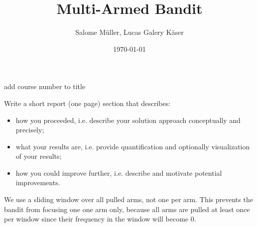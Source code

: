 \documentclass[10pt]{article}
\title{Multi-Armed Bandit}
\author{Salome Müller, Lucas Galery Käser}
\date{\today}
\newcommand{\todo}[1]{{\color{red}#1}}
\begin{document}
\maketitle

\todo{add course number to title}

\todo{
    Write a short report (one page) section that describes:
    \begin{itemize}
        \item how you proceeded, i.e. describe your solution approach conceptually and precisely;\\
        \item what your results are, i.e. provide quantification and optionally visualization of your results;\\
        \item how you could improve further, i.e. describe and motivate potential improvements.\\
    \end{itemize}

    We use a sliding window over all pulled arms, not one per arm.
    This prevents the bandit from focusing one one arm only, because all arms are pulled at least once per window since their frequency in the window will become 0.
}
\end{document}
